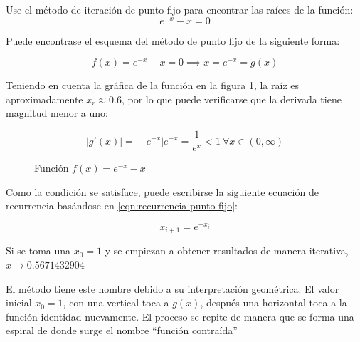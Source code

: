 \begin{ex}
    Use el método de iteración de punto fijo para encontrar las raíces de la
    función:
    \[
        e^{-x} - x = 0
    \]

    \begin{solution}

        Puede encontrase el esquema del método de punto fijo de la siguiente
        forma:

        \[
            f(x) = e^{-x} - x = 0 \implies x = e^{-x} = g(x)
        \]

        Teniendo en cuenta la gráfica de la función en la figura
        \ref{fig:ejercicio-punto-fijo}, la raíz es aproximadamente $x_r \approx
        0.6$, por lo que puede verificarse que la derivada tiene magnitud menor
        a uno:

        \[
            \left| g'(x) \right| = \left| -e^{-x} \right| e^{-x} =
            \frac{1}{e^x} < 1\ \forall x \in (0, \infty)
        \]

        \begin{figure}
            \centering
            \caption{Función $f(x) = e^{-x} - x$}
            \label{fig:ejercicio-punto-fijo}
        \end{figure}

        Como la condición se satisface, puede escribirse la siguiente ecuación
        de recurrencia basándose en \ref{eqn:recurrencia-punto-fijo}:

        \[
            x_{i+1} = e^{-x_i}
        \]

        Si se toma una $x_0 = 1$ y se empiezan a obtener resultados de
        manera iterativa, $x \rightarrow 0.5671432904$

    \end{solution}
\end{ex}

El método tiene este nombre debido a su interpretación geométrica. El valor
inicial $x_0 = 1$, con una vertical toca a $g(x)$, después una horizontal toca a
la función identidad nuevamente. El proceso se repite de manera que se forma una
espiral de donde surge el nombre ``función contraída''

